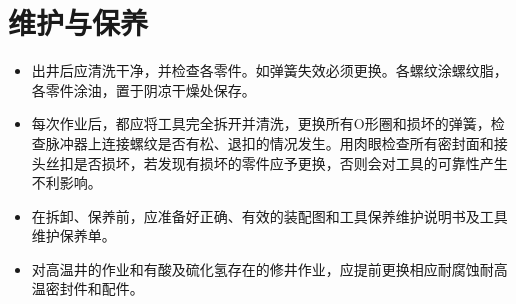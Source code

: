 \section{维护与保养}
\begin{itemize}
	\item 	出井后应清洗干净，并检查各零件。如弹簧失效必须更换。各螺纹涂螺纹脂，各零件涂油，置于阴凉干燥处保存。
\item 	 每次作业后，都应将工具完全拆开并清洗，更换所有O形圈和损坏的弹簧，检查脉冲器上连接螺纹是否有松、退扣的情况发生。用肉眼检查所有密封面和接头丝扣是否损坏，若发现有损坏的零件应予更换，否则会对工具的可靠性产生不利影响。
\item 	在拆卸、保养前，应准备好正确、有效的装配图和工具保养维护说明书及工具维护保养单。
\item 	对高温井的作业和有酸及硫化氢存在的修井作业，应提前更换相应耐腐蚀耐高温密封件和配件。
\end{itemize}

















